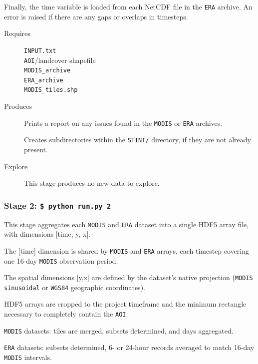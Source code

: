 \documentclass[twoside,a4paper]{refart}
\begin{document}
Finally, the time variable is loaded from each NetCDF file in the 
\texttt{ERA} archive.  An error is raised if there are any gaps 
or overlaps in timesteps.


  \begin{description}
    \item [Requires]
          \texttt{INPUT.txt} \\
          \texttt{AOI}/landcover shapefile \\
          \texttt{MODIS\_archive} \\
          \texttt{ERA\_archive} \\
          \texttt{MODIS\_tiles.shp}


    \item [Produces]
      Prints a report on any issues found in the 
      \texttt{MODIS} or \texttt{ERA} archives.
      
      Creates subdirectories within the \texttt{STINT/} directory, 
      if they are not already present.


    \item [Explore]
      This stage produces no new data to explore.
  \end{description}
  
\subsubsection{\textbf{Stage 2:} \texttt{\$ python run.py 2}}
This stage aggregates each \texttt{MODIS} and \texttt{ERA} dataset into
a single HDF5 array file, with dimensions [time, y, x].

The [time] dimension is shared by \texttt{MODIS} and \texttt{ERA} arrays, each timestep covering one 16-day \texttt{MODIS} observation period.

The spatial dimensions [y,x] are defined by the dataset's 
native projection (\texttt{MODIS sinusoidal} or \texttt{WGS84} geographic coordinates).
        
HDF5 arrays are cropped to the project timeframe and the minimum 
rectangle necessary to completely contain the \texttt{AOI}.


\texttt{MODIS} datasets: tiles are merged, subsets determined, and days aggregated.

\texttt{ERA} datasets: subsets determined, 6- or 24-hour records averaged to match 16-day \texttt{MODIS} intervals.
\end{document}
